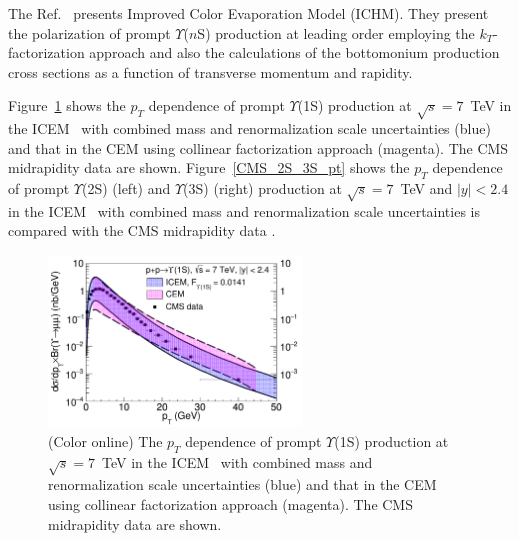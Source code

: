 The Ref.~\cite{Cheung:2018upe} presents Improved Color Evaporation Model (ICHM).
They present the polarization of prompt $\varUpsilon$($n$S) production at
leading order employing the $k_T$-factorization approach and also 
the calculations of the bottomonium production cross sections as a function of
transverse momentum and rapidity.

Figure~\ref{CMS_1S_pt} shows the $p_T$ dependence of prompt $\varUpsilon$(1S) production
  at $\sqrt{s} = 7$~TeV in the ICEM~\cite{Cheung:2018upe} with combined mass and renormalization scale
  uncertainties (blue) and that in the CEM using collinear factorization approach (magenta).
  The CMS midrapidity data \cite{Chatrchyan:2013yna} are shown.
Figure~\ref{CMS_2S_3S_pt} shows 
  the $p_T$ dependence of prompt $\varUpsilon$(2S) (left) and $\varUpsilon$(3S) (right)
  production at $\sqrt{s} = 7$~TeV
  and $|y|<2.4$ in the ICEM~\cite{Cheung:2018upe} with combined mass and renormalization scale uncertainties
  is compared with the CMS midrapidity data \cite{Chatrchyan:2013yna}.

\begin{figure}
\centering
\includegraphics[width=0.60\textwidth]{Figures/RV1S.pdf}
\caption{(Color online) The $p_T$ dependence of prompt $\varUpsilon$(1S) production
  at $\sqrt{s} = 7$~TeV in the ICEM~\cite{Cheung:2018upe} with combined mass and renormalization scale
  uncertainties (blue) and that in the CEM using collinear factorization approach (magenta).
  The CMS midrapidity data \cite{Chatrchyan:2013yna} are shown.}
\label{CMS_1S_pt}
\end{figure}



